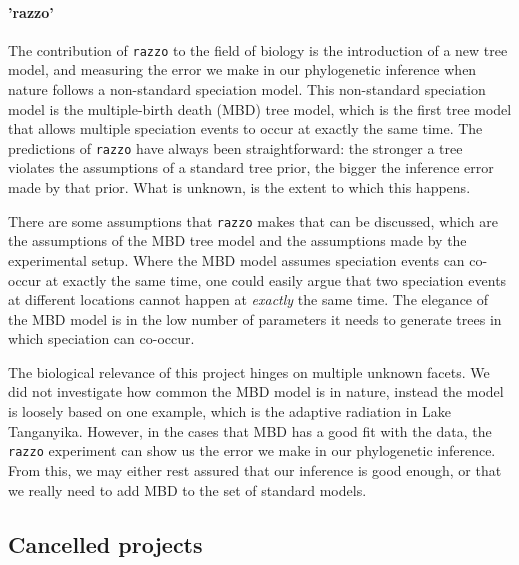 \paragraph{'razzo'} 

The contribution of \verb;razzo; to the field of biology
is the introduction of a new tree model, 
and measuring the error we make in our phylogenetic inference when
nature follows a non-standard speciation model.
This non-standard speciation model is the multiple-birth death (MBD) tree model,
which is the first tree model that allows multiple speciation events to occur 
at exactly the same time.
The predictions of \verb;razzo; have always been straightforward:
the stronger a tree violates the assumptions of a standard tree
prior, the bigger the inference error made by that prior.
What is unknown, is the extent to which this happens.

There are some assumptions that \verb;razzo; makes that can be discussed,
which are the assumptions of the MBD tree model and the assumptions
made by the experimental setup.
Where the MBD model assumes speciation events can co-occur at exactly
the same time, one could easily argue that two speciation events
at different locations cannot happen at \emph{exactly} the same time.
The elegance of the MBD model is in the low number of parameters it
needs to generate trees in which speciation can co-occur.

The biological relevance of this project hinges on multiple unknown
facets. We did not investigate how common the MBD model is in nature,
instead the model is loosely based on one example, which is the 
adaptive radiation in Lake Tanganyika. However,
in the cases that MBD has a good fit with the data, 
the \verb;razzo; experiment can show us the error we make in our phylogenetic 
inference. From this, we may either rest assured that our inference is good 
enough, or that we really need to add MBD to the set of standard models.


\subsection{Cancelled projects}

